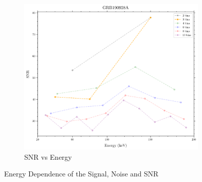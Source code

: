\documentclass[11pt]{book} %
\begin{document}
\begin{figure}[H]
\begin{subfigure}[b]{0.3\textwidth}
    \end{subfigure}
    \begin{subfigure}[b]{0.3\textwidth}   
        \centering 
        \includegraphics[width=\textwidth]{Pictures/snrvsenergy.png}
        \caption{SNR vs Energy}
    \end{subfigure}
    \caption{Energy Dependence of the Signal, Noise and SNR}
\end{figure}












\end{document}
